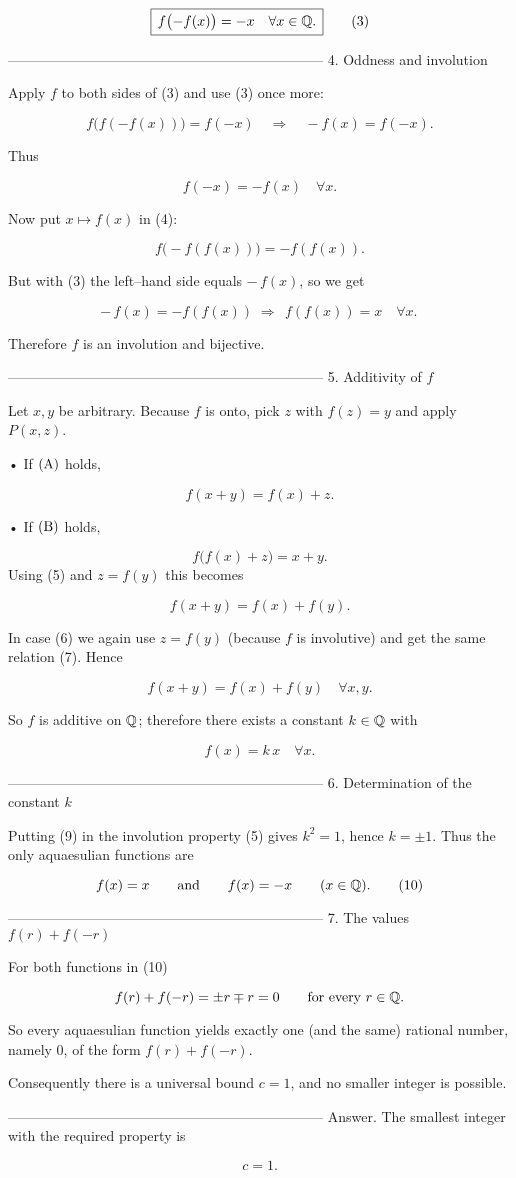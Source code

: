 \[
\boxed{\,f\bigl(-f(x)\bigr)=-x\quad\forall x\in\Bbb Q.\,}\tag{3}
\]

--------------------------------------------------------------------
4.  Oddness and involution

Apply $f$ to both sides of (3) and use (3) once more:

\[
f\bigl(f(-f(x))\bigr)=f(-x)\quad\Longrightarrow\quad
-f(x)=f(-x).
\]

Thus  

\[
\boxed{\,f(-x)=-f(x)\quad\forall x.\,}\tag{4}
\]

Now put $x\mapsto f(x)$ in (4):

\[
f\bigl(-f(f(x))\bigr)=-f(f(x)).
\]

But with (3) the left–hand side equals $-\,f(x)$, so we get  

\[
-\,f(x)=-f(f(x))\;\Longrightarrow\;
\boxed{\,f(f(x))=x\quad\forall x.\,}\tag{5}
\]

Therefore $f$ is an involution and bijective.

--------------------------------------------------------------------
5.  Additivity of $f$

Let $x,y$ be arbitrary.  
Because $f$ is onto, pick $z$ with $f(z)=y$ and apply $P(x,z)$.

• If $(\text A)$ holds,  

\[
f(x+y)=f(x)+z. \tag{6}
\]

• If $(\text B)$ holds,  

\[
f\bigl(f(x)+z\bigr)=x+y.
\]
Using (5) and $z=f(y)$ this becomes  

\[
f(x+y)=f(x)+f(y). \tag{7}
\]

In case (6) we again use $z=f(y)$ (because $f$ is involutive) and get
the same relation (7).
Hence  

\[
\boxed{\,f(x+y)=f(x)+f(y)\quad\forall x,y.\,}\tag{8}
\]

So $f$ is additive on $\Bbb Q$; therefore there exists a constant
$k\in\Bbb Q$ with  

\[
f(x)=k\,x\quad\forall x. \tag{9}
\]

--------------------------------------------------------------------
6.  Determination of the constant $k$

Putting (9) in the involution property (5) gives $k^{2}=1$, hence
$k=\pm1$.  
Thus the only aquaesulian functions are

\[
f(x)=x\qquad\text{and}\qquad f(x)=-x\qquad(x\in\Bbb Q). \tag{10}
\]

--------------------------------------------------------------------
7.  The values $f(r)+f(-r)$

For both functions in (10)

\[
f(r)+f(-r)=\pm r\mp r=0\qquad\text{for every }r\in\Bbb Q.
\]

So every aquaesulian function yields exactly one (and the same)
rational number, namely $0$, of the form $f(r)+f(-r)$.

Consequently there is a universal bound $c=1$, and no smaller integer
is possible.  

--------------------------------------------------------------------
Answer.  
The smallest integer with the required property is  

\[
\boxed{c=1}.
\]